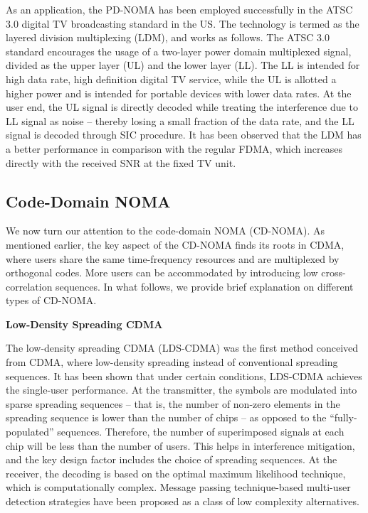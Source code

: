 \begin{multicols}{2}
As an application, the PD-NOMA has been employed successfully in the ATSC 3.0 digital TV broadcasting standard in the US. The technology is termed as the layered division multiplexing (LDM), and works as follows. The ATSC 3.0 standard encourages the usage of a two-layer power domain multiplexed signal, divided as the upper layer (UL) and the lower layer (LL). The LL is intended for high data rate, high definition digital TV service, while the UL is allotted a higher power and is intended for portable devices with lower data rates. At the user end, the UL signal is directly decoded while treating the interference due to LL signal as noise -- thereby losing a small fraction of the data rate, and the LL signal is decoded through SIC procedure. It has been observed that the LDM has a better performance in comparison with the regular FDMA, which increases directly with the received SNR at the fixed TV unit.\\[-.5cm]

\subsection{Code-Domain NOMA} \label{SubSecCDNOMA}

We now turn our attention to the code-domain NOMA (CD-NOMA). As mentioned earlier, the key aspect of the CD-NOMA finds its roots in CDMA, where users share the same time-frequency resources and are multiplexed by orthogonal codes. More users can be accommodated by introducing low cross-correlation sequences. In what follows, we provide brief explanation on different types of CD-NOMA.

\smallskip
\noindent
{\bf Low-Density Spreading CDMA}


The low-density spreading CDMA (LDS-CDMA) was the first method conceived from CDMA, where low-density spreading instead of conventional spreading sequences. It has been shown that under certain conditions, LDS-CDMA achieves the single-user performance. At the transmitter, the symbols are modulated into sparse spreading sequences -- that is, the number of non-zero elements in the spreading sequence is lower than the number of chips -- as opposed to the ``fully-populated'' sequences. Therefore, the number of superimposed signals at each chip will be less than the number of users. This helps in interference mitigation, and the key design factor includes the choice of spreading sequences. At the receiver, the decoding is based on the optimal maximum likelihood technique, which is computationally complex. Message passing technique-based multi-user detection strategies have been proposed as a class of low complexity alternatives.


\end{multicols}
